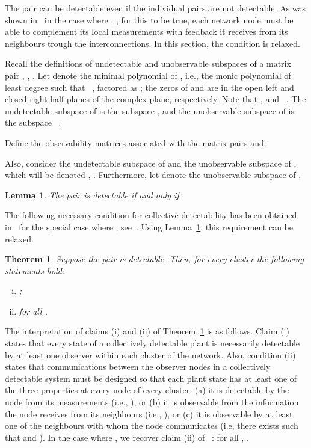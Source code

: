 \documentclass[a4paper,10pt,conference]{ieeeconf}
\newtheorem{theorem}{Theorem}
\newtheorem{lemma}{Lemma}
\begin{document}
The pair  can be detectable even if
the individual pairs  are not detectable. As was shown
in~\cite{U7b-journal} in the case where ,  
, for this to be true, each network node must be able
to complement its local measurements with feedback it receives from its 
neighbours trough the interconnections. In this section, the condition
 is relaxed.  









Recall the definitions of undetectable and unobservable subspaces of a
matrix pair , , . Let  denote the minimal polynomial
    of , i.e., the monic polynomial of least degree such that
~\cite{Wonham}, factored as 
; the zeros of
 and  are in the open left and closed right
half-planes of the complex plane, respectively. Note that
, and  ~\cite{Wonham}. The undetectable subspace
of  is the subspace , and the unobservable subspace of 
is the subspace ~\cite{CD-1991}.       

Define the observability matrices associated with the matrix pairs
 and :

Also, consider the undetectable subspace of 
and the unobservable subspace of , which
will be denoted , . Furthermore, let
 denote the unobservable subspace of ,  


\begin{lemma}\label{lemma.barO}
The pair  is detectable if and only if 

\end{lemma}


The following necessary condition for collective detectability has been
obtained in~\cite{U7b-journal} for the special case where ;
see~\cite[Theorem 3]{U7b-journal}. Using Lemma~\ref{lemma.barO}, this
requirement can be relaxed.  

\begin{theorem}\label{detect.theorem}
Suppose the pair  is detectable. Then, for
every cluster  
the following statements hold:
\begin{enumerate}[(i)]
\item
;
\item for all ,

\end{enumerate}
\end{theorem}



The interpretation of claims (i) and (ii) of Theorem~\ref{detect.theorem} 
is as follows. Claim (i) states that every state of a collectively
detectable plant is necessarily detectable by at least one observer
within each cluster of the network. 
Also, condition (ii) states that communications between the observer
nodes in a collectively detectable system must be designed so that 
each plant state  has at least one of the three properties at every node
of every cluster: (a) it is detectable by the node from its measurements (i.e.,
), or (b) it is observable from the information the node
receives from its neighbours (i.e., ), or (c) 
it is observable by at least one of the neighbours with whom the node
communicates (i.e, there exists  such that  and
). In the case where  , we
recover claim (ii) of ~\cite[Theorem 3]{U7b-journal}: for all
, 
. 
\end{document}

